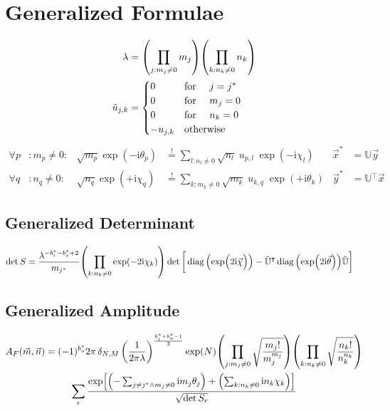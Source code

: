 \documentclass[
	english,
	a4paper,
	fontsize=10pt,
	parskip=half,
	titlepage=true,
	DIV=12,
	final
]{scrreprt}
\newcommand*{\transp}{\ensuremath{^\intercal}}
\newcommand*{\iunit}{\ensuremath{\mathrm{i}}}
\newcommand*{\equalCond}{  \mathop{=}\limits^!  }
\DeclareMathOperator{\diag}{diag}
\begin{document}
\section{Generalized Formulae}
\begin{align}
	\lambda
&=
	\qty( \prod_{j : m_j \neq 0} m_j )
	\qty( \prod_{k : n_k \neq 0} n_k )
\label{eqn:DefLambda_generic}
\\
	\tilde{u}_{j,k} 
&=
	\begin{cases}
		0			&\qq*{for } j = j^* \\
		0			&\qq*{for } m_j = 0 \\
		0			&\qq*{for } n_k = 0 \\
		-u_{j,k}		&\qotherwise*
	\end{cases}
\label{eqn:DefReducedDFT_generic}
\end{align}
\begin{align}
	\forall p &: m_p \neq 0 :
&
	\sqrt{m_p} \exp(-\iunit \theta_p)
&\equalCond
	\sum_{l : n_l \neq 0} \sqrt{n_l} \; u_{p,l} \; \exp(-\iunit\chi_l)
&
	\vec{x}^{*} &= \mathbb{U} \vec{y}
\label{eqn:FourierLinkForward_generic}
\\
	\forall q &: n_q \neq 0 :
&
	\sqrt{n_q} \exp(+\iunit \chi_q)
&\equalCond
	\sum_{k : m_k \neq 0}
	\sqrt{m_k} \; u_{k,q} \; \exp(+\iunit\theta_k)
&
	\vec{y}^{*} &= \mathbb{U}\transp \vec{x}
\label{eqn:FourierLinkBackward_generic}
\end{align}

\subsection{Generalized Determinant}
\begin{align}
	\det S
&=
	\frac{ \lambda^{-b_i^* - b_o^* + 2} }{ m_{j^*} }
	\qty( \prod_{k: n_k \neq 0} \exp(-2\iunit \chi_k) )
	\det\qty[\bigg.
		\diag\qty(\exp(\Big.2\iunit\vec{\chi}))
		-
		\tilde{\mathbb{U}}\transp
		\diag\qty(\exp(2\iunit\vec{\theta}))
		\tilde{\mathbb{U}}
	]
\label{eqn:detS_generic}
\end{align}

\subsection{Generalized Amplitude}
\begin{multline}
	A_F(\vec{m}, \vec{n})
=
	(-1)^{b_o^*}
	2\pi \, \delta_{N,M} \, \qty(
		\frac{1}{2\pi\lambda}
	)^{\frac{b_i^* + b_o^* - 1}{2}}
	\exp(N)
	\qty( \prod_{j : m_j \neq 0}
		\sqrt{\frac
			{ m_j! }
			{ m_j^{m_j} }
	})
	\qty( \prod_{k : n_k \neq 0}
		\sqrt{\frac
			{ n_k! }
			{ n_k^{n_k} }
	})
\\
	\sum_r
		\frac
		{\exp[
			\qty(- \sum_{j\neq j^* \land m_j \neq 0} \iunit m_j \theta_j) + 
			\qty(  \sum_{k : n_k \neq 0}             \iunit n_k \chi  _k)
		]}
		{\sqrt{\det S_r}}
\label{eqn:Amp_generic}
\end{multline}
\end{document}
